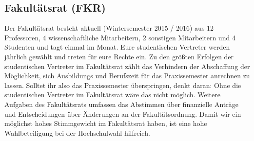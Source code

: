 \subsection{Fakultätsrat (FKR)}
Der Fakultätsrat besteht aktuell (Wintersemester 2015 / 2016) aus 12
Professoren, 4 wissenschaftliche Mitarbeitern, 2 sonstigen Mitarbeitern und 4 Studenten und tagt einmal
im Monat. Eure studentischen Vertreter werden jährlich gewählt und 
treten für eure Rechte ein. \doublebreak
Zu den größten Erfolgen der studentischen Vertreter im Fakultätsrat 
zählt das Verhindern der Abschaffung der Möglichkeit, sich Ausbildungs und Berufszeit für das Praxissemester anrechnen zu lassen. Solltet ihr also das 
Praxissemester überspringen, denkt daran: Ohne die studentischen 
Vertreter im Fakultätsrat wäre das nicht möglich. Weitere Aufgaben 
des Fakultätsrats umfassen das Abstimmen über finanzielle Anträge 
und Entscheidungen über Änderungen an der Fakultätsordnung. Damit 
wir ein möglichst hohes Stimmgewicht im Fakultätsrat haben, ist eine 
hohe Wahlbeteiligung bei der Hochschulwahl hilfreich. 